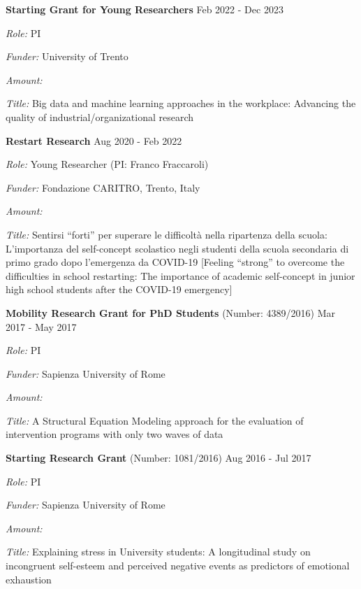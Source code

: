 \documentclass[hidelinks, letterpaper,10pt]{article} %
\begin{document}
	\begin{center}
		\parbox{6.5in}{{\textbf{Starting Grant for Young Researchers}}   \hspace{6.5cm} Feb 2022 - Dec 2023}
		\parbox{6.5in}{\textit{Role:} PI}
		\parbox{6.5in}{\textit{Funder:} University of Trento}
	    \parbox{6.5in}{\textit{Amount:} } 
	    \parbox{6.5in}{\textit{Title:} Big data and machine learning approaches in the workplace: Advancing the quality of industrial/organizational research}
	    \vspace{3mm}
	\end{center}

	\begin{center}
		\parbox{6.5in}{{\textbf{Restart Research}}   \hspace{10cm} Aug 2020 - Feb 2022}
		\parbox{6.5in}{\textit{Role:} Young Researcher (PI: Franco Fraccaroli)}
		\parbox{6.5in}{\textit{Funder:} Fondazione CARITRO, Trento, Italy}
	    \parbox{6.5in}{\textit{Amount:} } 
	    \parbox{6.5in}{\textit{Title:} Sentirsi “forti” per superare le difficoltà nella ripartenza della scuola: L’importanza del self-concept scolastico negli studenti della scuola secondaria di primo grado dopo l’emergenza da COVID-19 [Feeling “strong” to overcome the difficulties in school restarting: The importance of academic self-concept in junior high school students after the COVID-19 emergency]}
	    \vspace{3mm}
	\end{center}
	
	\begin{center}
		\parbox{6.5in}{{\textbf{Mobility Research Grant for PhD Students} (Number: 4389/2016)}   \hspace{2cm} Mar 2017 - May 2017}
		\parbox{6.5in}{\textit{Role:} PI}
		\parbox{6.5in}{\textit{Funder:} Sapienza University of Rome}
		\parbox{6.5in}{\textit{Amount:} }
		\parbox{6.5in}{\textit{Title:} A Structural Equation Modeling approach for the evaluation of intervention programs with only two waves of data}
		\vspace{3mm}
	\end{center}
	
	\begin{center}
		\parbox{6.5in}{{\textbf{Starting Research Grant} (Number: 1081/2016)}   \hspace{5.5cm} Aug 2016 - Jul 2017}
		\parbox{6.5in}{\textit{Role:} PI}
		\parbox{6.5in}{\textit{Funder:} Sapienza University of Rome}
		\parbox{6.5in}{\textit{Amount:} }
		\parbox{6.5in}{\textit{Title:} Explaining stress in University students: A longitudinal study on incongruent self-esteem and perceived negative events as predictors of emotional exhaustion}
	\end{center}
\end{document}
